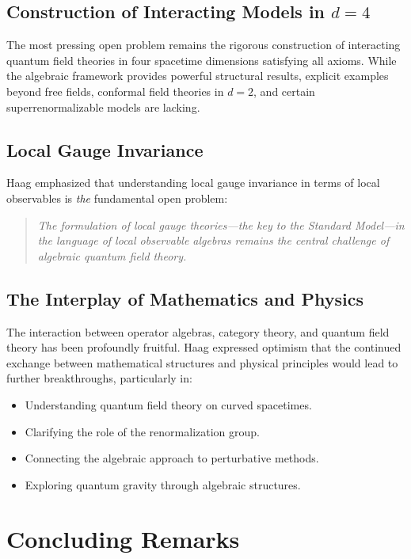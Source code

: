 \documentclass[11pt,a4paper]{article}
\begin{document}
\subsection{Construction of Interacting Models in $d=4$}

The most pressing open problem remains the rigorous construction of
interacting quantum field theories in four spacetime dimensions satisfying
all axioms. While the algebraic framework provides powerful structural
results, explicit examples beyond free fields, conformal field theories
in $d=2$, and certain superrenormalizable models are lacking.

\subsection{Local Gauge Invariance}

Haag emphasized that understanding local gauge invariance in terms of
local observables is \emph{the} fundamental open problem:
\begin{quote}
\emph{The formulation of local gauge theories---the key to the Standard
Model---in the language of local observable algebras remains the central
challenge of algebraic quantum field theory.}
\end{quote}

\subsection{The Interplay of Mathematics and Physics}

The interaction between operator algebras, category theory, and quantum
field theory has been profoundly fruitful. Haag expressed optimism that
the continued exchange between mathematical structures and physical
principles would lead to further breakthroughs, particularly in:
\begin{itemize}[nosep]
  \item Understanding quantum field theory on curved spacetimes.
  \item Clarifying the role of the renormalization group.
  \item Connecting the algebraic approach to perturbative methods.
  \item Exploring quantum gravity through algebraic structures.
\end{itemize}

\section{Concluding Remarks}
\end{document}
